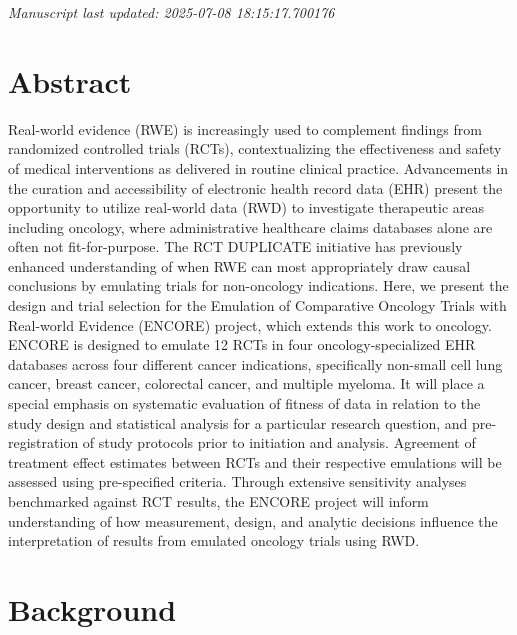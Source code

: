 \documentclass[
  letterpaper,
  DIV=11,
  numbers=noendperiod]{scrartcl}
\begin{document}
\emph{Manuscript last updated: 2025-07-08 18:15:17.700176}

\newpage{}

\section*{Abstract}\label{abstract}

Real-world evidence (RWE) is increasingly used to complement findings
from randomized controlled trials (RCTs), contextualizing the
effectiveness and safety of medical interventions as delivered in
routine clinical practice. Advancements in the curation and
accessibility of electronic health record data (EHR) present the
opportunity to utilize real-world data (RWD) to investigate therapeutic
areas including oncology, where administrative healthcare claims
databases alone are often not fit-for-purpose. The RCT DUPLICATE
initiative has previously enhanced understanding of when RWE can most
appropriately draw causal conclusions by emulating trials for
non-oncology indications. Here, we present the design and trial
selection for the Emulation of Comparative Oncology Trials with
Real-world Evidence (ENCORE) project, which extends this work to
oncology. ENCORE is designed to emulate 12 RCTs in four
oncology-specialized EHR databases across four different cancer
indications, specifically non-small cell lung cancer, breast cancer,
colorectal cancer, and multiple myeloma. It will place a special
emphasis on systematic evaluation of fitness of data in relation to the
study design and statistical analysis for a particular research
question, and pre-registration of study protocols prior to initiation
and analysis. Agreement of treatment effect estimates between RCTs and
their respective emulations will be assessed using pre-specified
criteria. Through extensive sensitivity analyses benchmarked against RCT
results, the ENCORE project will inform understanding of how
measurement, design, and analytic decisions influence the interpretation
of results from emulated oncology trials using RWD.

\newpage{}

\section{Background}\label{background}
\end{document}
